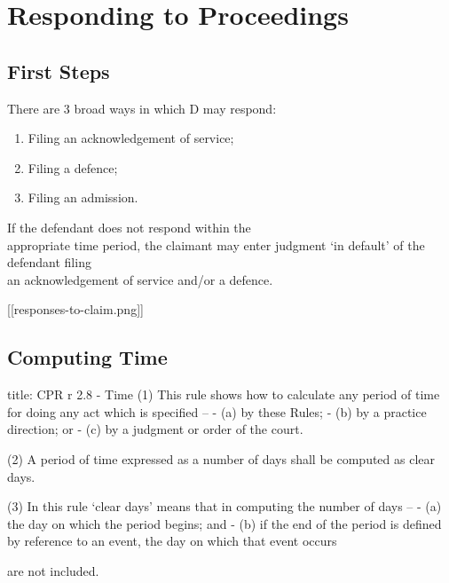 \documentclass[
]{article}
\newenvironment{Shaded}{}{}
\newcommand{\NormalTok}[1]{#1}
\providecommand{\tightlist}{%
  \setlength{\itemsep}{0pt}\setlength{\parskip}{0pt}}
\begin{document}
\hypertarget{responding-to-proceedings}{%
\section{Responding to Proceedings}\label{responding-to-proceedings}}

\hypertarget{first-steps}{%
\subsection{First Steps}\label{first-steps}}

There are 3 broad ways in which D may respond:

\begin{enumerate}
\def\labelenumi{\arabic{enumi}.}
\tightlist
\item
  Filing an acknowledgement of service;
\item
  Filing a defence;
\item
  Filing an admission.
\end{enumerate}

If the defendant does not respond within the\\
appropriate time period, the claimant may enter judgment `in default' of
the defendant filing\\
an acknowledgement of service and/or a defence.

{[}{[}responses-to-claim.png{]}{]}

\hypertarget{computing-time}{%
\subsection{Computing Time}\label{computing-time}}

\begin{Shaded}
\begin{Highlighting}[]
\NormalTok{title: CPR r 2.8 {-} Time}
\NormalTok{(1) This rule shows how to calculate any period of time for doing any act which is specified –  }
\NormalTok{{-} (a) by these Rules; }
\NormalTok{{-} (b) by a practice direction; or }
\NormalTok{{-} (c) by a judgment or order of the court.  }
  
\NormalTok{(2) A period of time expressed as a number of days shall be computed as clear days.  }
  
\NormalTok{(3) In this rule ‘clear days’ means that in computing the number of days –  }
\NormalTok{{-} (a) the day on which the period begins; and }
\NormalTok{{-} (b) if the end of the period is defined by reference to an event, the day on which that event occurs  }

\NormalTok{are not included.}
\end{Highlighting}
\end{Shaded}
\end{document}
